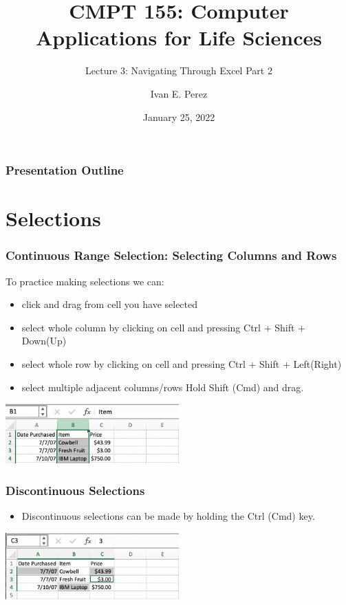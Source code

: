 \documentclass[12pt]{beamer}
\title{CMPT 155: Computer Applications for Life Sciences}
\subtitle{Lecture 3: Navigating Through Excel Part 2}
\author{Ivan E. Perez}
\institute{}
\date{January 25, 2022}
\begin{document}
	\begin{frame}
		\titlepage
	\end{frame}
	
	\begin{frame}
		\frametitle{Presentation Outline}
		\tableofcontents
		
	\end{frame}
	
\section{Selections}
	\begin{frame}
		\frametitle{Continuous Range Selection: Selecting Columns and Rows}
		To practice making selections we can:
		\begin{itemize}
			\item click and drag from cell you have selected
			\item select whole column by clicking on cell and pressing Ctrl + Shift + Down(Up)
			\item select whole row by clicking on cell and pressing Ctrl + Shift + Left(Right)
			\item select multiple adjacent columns/rows Hold Shift (Cmd) and drag.
		\end{itemize} 
	\begin{center}
		\includegraphics[width=0.5\textwidth]{continuous_selections.png}
	\end{center}
	\end{frame}
	
	\begin{frame}
		\frametitle{Discontinuous Selections}
		\begin{itemize}
			\item Discontinuous selections can be made by holding the Ctrl (Cmd) key. 
		\end{itemize}
	\begin{center}
		\includegraphics[width=0.5\textwidth]{discontinuous_selections.png}
	\end{center}
	\end{frame}
\end{document}
